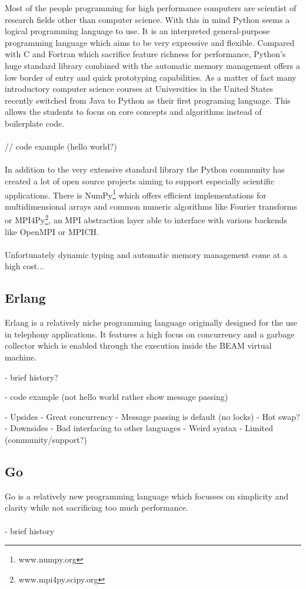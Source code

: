 Most of the people programming for high performance computers are scientist of research fields other
than computer science. With this in mind Python seems a logical programming language to use. It is
an interpreted general-purpose programming language which aims to be very expressive and flexible.
Compared with C and Fortran which sacrifice feature richness for performance, Python's huge standard
library combined with the automatic memory management offers a low border of entry and quick
prototyping capabilities.
As a matter of fact many introductory computer science courses at Universities in the
United States recently switched from Java to Python as their first programing language.\autocite{GUO14}
This allows the students to focus on core concepts and algorithms instead of boilerplate code.
\\ \\
// code example (hello world?)
\\ \\
In addition to the very extensive standard library the Python community has created a lot of open
source projects aiming to support especially scientific applications. There is NumPy\footnote{
www.numpy.org} which offers efficient implementations for multidimensional arrays and common numeric
algorithms like Fourier transforms or MPI4Py\footnote{www.mpi4py.scipy.org}, an MPI abstraction layer
able to interface with various backends like OpenMPI or MPICH.
\\ \\
Unfortunately dynamic typing and automatic memory management come at a high cost...

\subsection*{Erlang}
\label{ssec:Candidates.Erlang}
Erlang is a relatively niche programming language originally designed for the use in telephony
applications. It features a high focus on concurrency and a garbage collector which is enabled
through the execution inside the BEAM virtual machine.

- brief history?

- code example (not hello world rather show message passing)

- Upsides
    - Great concurrency
    - Message passing is default (no locks)
    - Hot swap?
- Downsides
    - Bad interfacing to other languages
    - Weird syntax
    - Limited (community/support?)


\subsection*{Go}
\label{ssec:Candidates.Go}
Go is a relatively new programming language which focusses on simplicity and clarity while not
sacrificing too much performance.
\\ \\
- brief history

